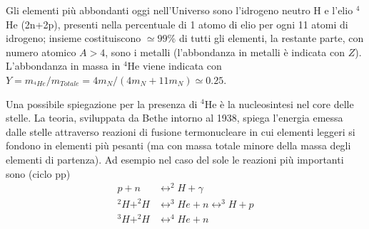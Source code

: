 Gli elementi più abbondanti oggi nell'Universo sono l'idrogeno neutro H e l'elio
$^4$He (2n+2p), presenti nella percentuale di 1 atomo di elio per ogni 11 atomi
di idrogeno; insieme costituiscono $\simeq 99$\% di tutti gli elementi, la
restante parte, con numero atomico $A>4$, sono i metalli (l'abbondanza in
metalli è indicata con $Z$).  L'abbondanza in massa in $^4$He viene indicata con
$Y= m_{^4He}/m_{Totale} = 4 m_N/(4 m_N + 11 m_N) \simeq 0.25$.

Una possibile spiegazione per la presenza di $^4$He è la nucleosintesi nel core
delle stelle.  La teoria, sviluppata da Bethe intorno al 1938, spiega l'energia
emessa dalle stelle attraverso reazioni di fusione termonucleare in cui elementi
leggeri si fondono in elementi più pesanti (ma con massa totale minore della
massa degli elementi di partenza).  Ad esempio nel caso del sole le reazioni più
importanti sono (ciclo pp)
\begin{subequations}
  \begin{align}
    p + n      & \leftrightarrow ^2H + \gamma \\
    ^2H + ^2H  & \leftrightarrow ^3He + n \leftrightarrow ^3H + p \\
    ^3H + ^2H  & \leftrightarrow ^4He + n
  \end{align}
  \label{ciclopp}
\end{subequations}

